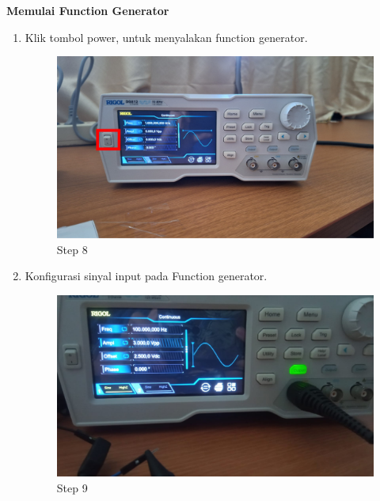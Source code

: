 \begin{center}
	\textbf{Memulai Function Generator}
	\begin{enumerate}
		\item Klik tombol power, untuk menyalakan function generator.
		\begin{figure}[H]
			\centering
			\includegraphics[width=0.8\linewidth]{P2/img/per1/step 8.png}
			\caption{Step 8}
			\label{fig:Step 8(Step 8)}
		\end{figure}

		\item Konfigurasi sinyal input pada Function generator.
		\begin{figure}[H]
			\centering
			\includegraphics[width=0.8\linewidth]{P2/img/per1/step 9.png}
			\caption{Step 9}
			\label{fig:Step 9(Step 9)}
		\end{figure}
	\end{enumerate}


\end{center}
